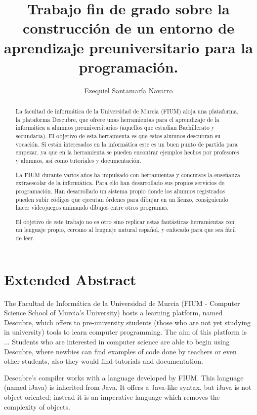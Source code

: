 \documentclass{report}
\author{Ezequiel Santamaría Navarro}
\title{Trabajo fin de grado sobre la construcción de un entorno de aprendizaje preuniversitario para la programación.}
\begin{document}
	\maketitle
	\tableofcontents
	\listoffigures
		
	\begin{abstract}
		La facultad de informática de la Universidad de Murcia (FIUM) aloja una plataforma, la plataforma Descubre, que ofrece unas herramientas para el aprendizaje de la informática a alumnos preuniversitarios (aquellos que estudian Bachillerato y secundaria). El objetivo de esta herramienta es que estos alumnos descubran su vocación. Si están interesados en la informática este es un buen punto de partida para empezar, ya que en la herramienta se pueden encontrar ejemplos hechos por profesores y alumnos, así como tutoriales y documentación. 
		
		La FIUM durante varios años ha impulsado con herramientas y concursos la enseñanza extraescolar de la informática. Para ello han desarrollado sus propios servicios de programación. Han desarrollado un sistema propio donde los alumnos registrados pueden subir códigos que ejecutan órdenes para dibujar en un lienzo, consiguiendo hacer videojuegos animando dibujos entre otros programas.
		
		El objetivo de este trabajo no es otro sino replicar estas fantásticas herramientas con un lenguaje propio, cercano al lenguaje natural español, y enfocado para que sea fácil de leer. 
	\end{abstract}
	
	\chapter{Extended Abstract}
	
	The Facultad de Informática de la Universidad de Murcia (FIUM - Computer Science School of Murcia's University) hosts a learning platform, named Descubre, which offers to pre-university students (those who are not yet studying in university) tools to learn computer programming. The aim of this platform is ... Students who are interested in computer science are able to begin using Descubre, where newbies can find examples of code done by teachers or even other students, also they would find tutorials and documentation. 
	
	Descubre's compiler works with a language developed by FIUM. This language (named iJava) is inherited from Java. It offers a Java-like syntax, but iJava is not object oriented; instead it is an imperative language which removes the complexity of objects.
	
\end{document}
